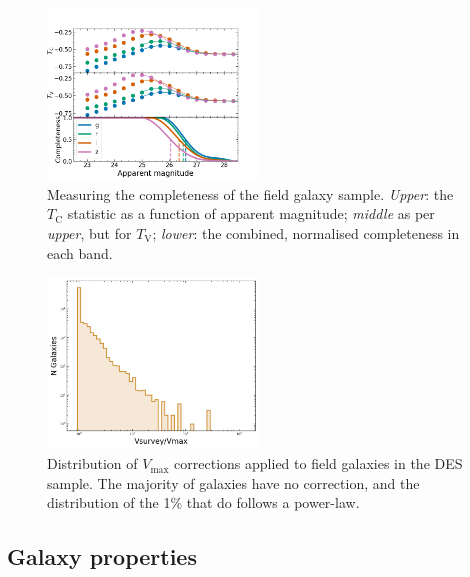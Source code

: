 \documentclass[fleqn,usenatbib]{mnras}
\begin{document}
\begin{figure}
    \centering
    \includegraphics[width=0.5\textwidth]{figs/completeness_combined.png}
    \caption{Measuring the completeness of the field galaxy sample. \textit{Upper}: the $T_{\mathrm{C}}$ statistic as a function of apparent magnitude; \textit{middle} as per \textit{upper}, but for $T_{\mathrm{V}}$; \textit{lower}: the combined, normalised completeness in each band.  
    \label{fig:completeness}}
\end{figure}

\begin{figure}
    \centering
    \includegraphics[width=0.5\textwidth]{figs/field_vmax.png}
    \caption{Distribution of $V_{\mathrm{max}}$ corrections applied to field galaxies in the DES sample. The majority of galaxies have no correction, and the distribution of the 1\% that do follows a power-law.
    \label{fig:vmax_field}}
\end{figure}
\subsection{Galaxy properties \label{subsec:properties}}
\end{document}
